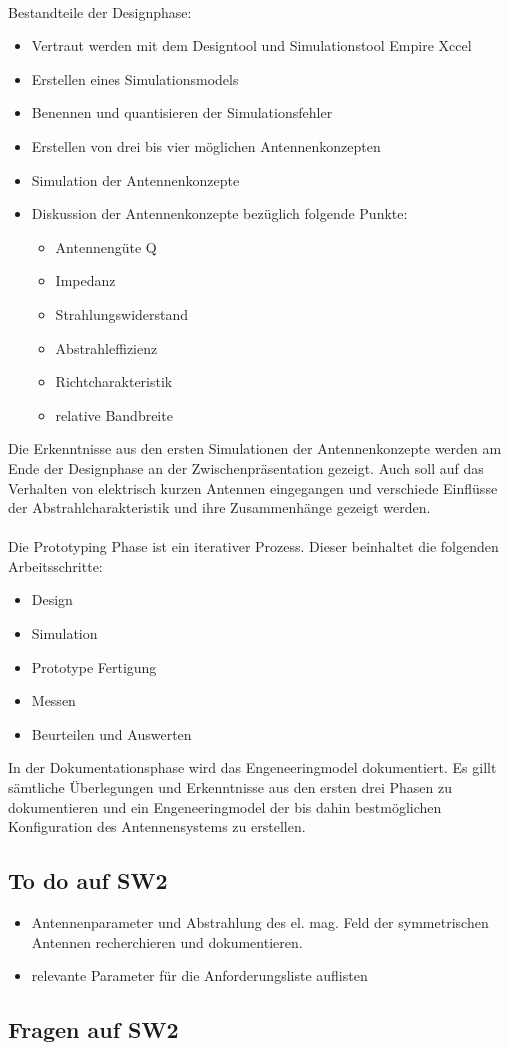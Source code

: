 \documentclass[10pt,a4paper]{report}
\begin{document}
\\ Bestandteile der Designphase:
\begin{itemize}
	 \item Vertraut werden mit dem Designtool und Simulationstool Empire  Xccel
	 \item Erstellen eines  Simulationsmodels  
	 \item Benennen und quantisieren der Simulationsfehler
	 \item Erstellen von drei bis vier möglichen Antennenkonzepten
	 \item Simulation der Antennenkonzepte
	 \item Diskussion der Antennenkonzepte bezüglich folgende Punkte:
		 \begin{itemize}
		 \item Antennengüte Q
		 \item Impedanz
		 \item Strahlungswiderstand
		 \item Abstrahleffizienz
		 \item Richtcharakteristik
		 \item relative Bandbreite
		 \end{itemize}
 \end{itemize} 
Die Erkenntnisse aus den ersten Simulationen der Antennenkonzepte werden am Ende der Designphase an der Zwischenpräsentation gezeigt. Auch soll auf das Verhalten von elektrisch kurzen Antennen eingegangen  und verschiede Einflüsse der Abstrahlcharakteristik und ihre Zusammenhänge  gezeigt werden. \\
\\Die Prototyping Phase ist ein iterativer  Prozess. Dieser beinhaltet die folgenden Arbeitsschritte:
   \begin{itemize}
	   \item Design
	   \item Simulation
	   \item Prototype Fertigung
	   \item Messen
	   \item Beurteilen und Auswerten
   \end{itemize}

In der Dokumentationsphase wird das Engeneeringmodel dokumentiert. Es gillt sämtliche Überlegungen und Erkenntnisse aus den ersten drei Phasen zu dokumentieren und ein Engeneeringmodel der bis dahin  bestmöglichen Konfiguration des Antennensystems zu erstellen. 
\subsection{To do auf SW2}
\begin{itemize}
	\item Antennenparameter und Abstrahlung des el. mag. Feld der symmetrischen Antennen recherchieren und dokumentieren.
	\item relevante Parameter für die Anforderungsliste auflisten
\end{itemize}
\subsection{Fragen auf SW2}
\end{document}
